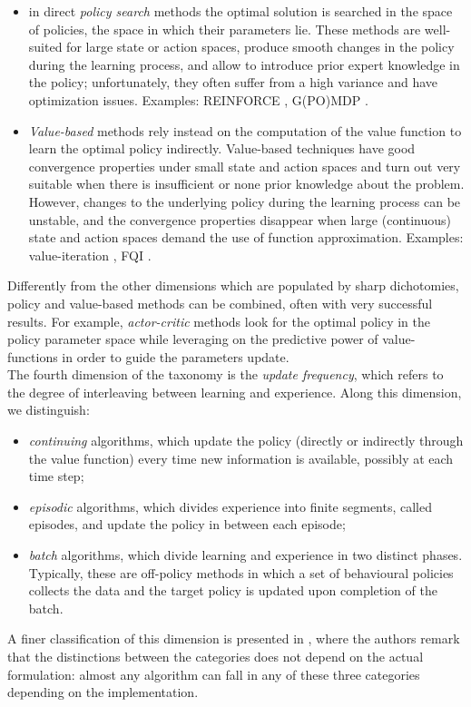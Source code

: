  \begin{itemize}
\item in direct \emph{policy search} methods the optimal solution is searched in the space of policies, \eg the space in which their parameters lie. These methods are well-suited for large state or action spaces,  produce smooth changes in the policy during the learning process, and allow to introduce prior expert knowledge in the policy; unfortunately, they often suffer from a high variance and have optimization issues. Examples: REINFORCE \cite{williams1992simple}, G(PO)MDP \cite{baxter2001infinite}.
\item \emph{Value-based} methods rely instead on the computation of the value function to learn the optimal policy indirectly. Value-based techniques have good convergence properties under small state and action spaces and turn out very suitable when there is insufficient or none prior knowledge about the problem. However, changes to the underlying policy during the learning process can be unstable, and the convergence properties disappear when large (\eg continuous) state and action spaces demand the use of function approximation. Examples: value-iteration \cite{sutton2018reinforcement}, FQI \cite{antos2008fitted}.
\end{itemize}

Differently from the other dimensions which are populated by sharp dichotomies, policy and value-based methods can be combined, often with very successful results. For example, \emph{actor-critic} methods \cite{grondman2012survey} look for the optimal policy in the policy parameter space while leveraging on the predictive power of value-functions in order to guide the parameters update. \\
The fourth dimension of the taxonomy is the \emph{update frequency}, which refers to the degree of interleaving between learning and experience. Along this dimension, we distinguish:
 \begin{itemize}
\item \emph{continuing} algorithms, which update the policy (directly or indirectly through the value function) every time new information is available, possibly at each time step;
\item \emph{episodic} algorithms, which divides experience into finite segments, called episodes, and update the policy in between each episode;\item \emph{batch} algorithms, which divide learning and experience in two distinct phases. Typically, these are off-policy methods in which a set of behavioural policies collects the data and the target policy is updated upon completion of the batch.
\end{itemize}
A finer classification of this dimension is presented in \cite{lange2012batch}, where the authors remark that the distinctions between the categories does not depend on the actual formulation: almost any algorithm can fall in any of these three categories depending on the implementation.

